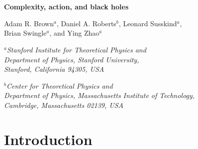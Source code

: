 \documentclass[12pt]{article}
\renewcommand{\title}[1]{\vbox{\center\LARGE{#1}}\vspace{5mm}}
\renewcommand{\author}[1]{\vbox{\center#1}\vspace{5mm}}
\newcommand{\address}[1]{\vbox{\center\em#1}}
\renewcommand{\title}[1]{\vbox{\center\bf{\Large{#1}}}\vspace{5mm}}
\numberwithin{equation}{section}
\begin{document}
\begin{titlepage}

\hfill \\
\hfill \\
\vskip 1cm

\title{Complexity, action, and black holes}

\author{Adam R. Brown${}^a$, Daniel A. Roberts${}^b$, Leonard Susskind${}^a$,  \\ Brian Swingle${}^a$, and Ying Zhao${}^a$ }

\address{${}^a$Stanford Institute for Theoretical Physics and\\
Department of Physics, Stanford University,\\
Stanford, California 94305, USA}

\address{${}^b$Center for Theoretical Physics and\\
Department of Physics, Massachusetts Institute of Technology,\\
Cambridge, Massachusetts 02139, USA}

\begin{abstract}

Our earlier paper ``Complexity Equals Action" conjectured that the quantum computational complexity of a holographic  state is given by the classical action of a region in the bulk (the ``Wheeler-DeWitt'' patch). We provide calculations for the results quoted  in that paper, explain how it fits into a broader (tensor) network of ideas,  and elaborate on the hypothesis that black holes are the fastest computers in nature.





\end{abstract}

\vfill

\end{titlepage}

\vfill\eject

\tableofcontents

\vfill\eject


\section{Introduction}
\end{document}
